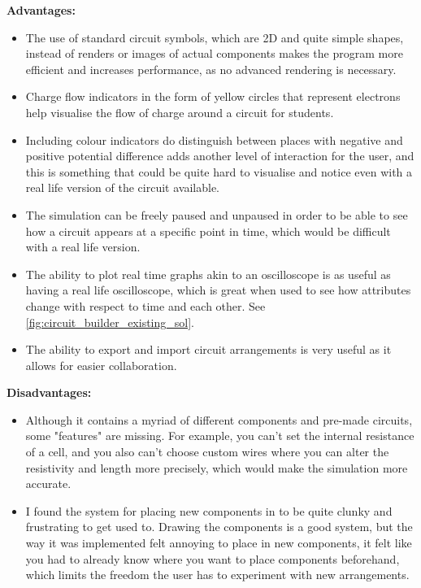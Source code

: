 \documentclass[11pt]{article}
\begin{document}
                \textbf{Advantages:}
                \begin{itemize}
                    \item The use of standard circuit symbols, which are 2D and quite simple shapes, instead of renders or images of actual components makes the program more efficient and increases performance, as no advanced rendering is necessary. 
                    \item Charge flow indicators in the form of yellow circles that represent electrons help visualise the flow of charge around a circuit for students. 
                    \item Including colour indicators do distinguish between places with negative and positive potential difference adds another level of interaction for the user, and this is something that could be quite hard to visualise and notice even with a real life version of the circuit available.
                    \item The simulation can be freely paused and unpaused in order to be able to see how a circuit appears at a specific point in time, which would be difficult with a real life version. 
                    \item The ability to plot real time graphs akin to an oscilloscope is as useful as having a real life oscilloscope, which is great when used to see how attributes change with respect to time and each other. See \autoref{fig:circuit_builder_existing_sol}.
                    \item The ability to export and import circuit arrangements is very useful as it allows for easier collaboration.
                \end{itemize}

                \textbf{Disadvantages:}
                \begin{itemize}
                    \item Although it contains a myriad of different components and pre-made circuits, some "features" are missing. For example, you can't set the internal resistance of a cell, and you also can't choose custom wires where you can alter the resistivity and length more precisely, which would make the simulation more accurate.
                    \item I found the system for placing new components in to be quite clunky and frustrating to get used to. Drawing the components is a good system, but the way it was implemented felt annoying to place in new components, it felt like you had to already know where you want to place components beforehand, which limits the freedom the user has to experiment with new arrangements. 
                \end{itemize}
\end{document}
